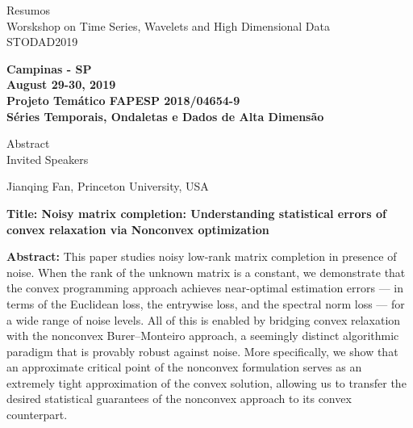\documentclass[11pt]{article}
\begin{document}
\thispagestyle{empty}
\begin{center}
  {\sc \Large Resumos}\\
  \vspace*{2cm} {\Huge \sc Worskshop on Time Series, Wavelets and High
    Dimensional Data \\ \vspace*{1cm} STODAD2019}
\end{center}
\vspace*{.2cm}
\begin{center} {\Large \bf
    Campinas - SP \\
    August 29-30,  2019\\
    \vspace*{1cm} Projeto Tem\'atico FAPESP 2018/04654-9 \\ {\bf
      S\'eries Temporais, Ondaletas e Dados de Alta Dimens\~ao}}
\end{center}
\newpage\vspace*{5cm}
\begin{center}
  {\sc \Huge Abstract \\
    Invited Speakers }
\end{center}



\newpage


{\large \sc Jianqing Fan, Princeton University, USA}


{\bf Title: Noisy matrix completion: Understanding statistical errors
  of convex relaxation via Nonconvex optimization}

{\bf Abstract:} This paper studies noisy low-rank matrix completion in
presence of noise.  When the rank of the unknown matrix is a constant,
we demonstrate that the convex programming approach achieves
near-optimal estimation errors --- in terms of the Euclidean loss, the
entrywise loss, and the spectral norm loss --- for a wide range of
noise levels.  All of this is enabled by bridging convex relaxation
with the nonconvex Burer--Monteiro approach, a seemingly distinct
algorithmic paradigm that is provably robust against noise.  More
specifically, we show that an approximate critical point of the
nonconvex formulation serves as an extremely tight approximation of
the convex solution, allowing us to transfer the desired statistical
guarantees of the nonconvex approach to its convex counterpart.
\end{document}

